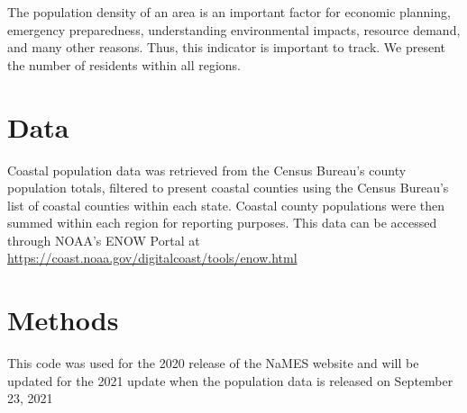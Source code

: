 \documentclass[
]{book}
\begin{document}
The population density of an area is an important factor for economic planning, emergency preparedness, understanding environmental impacts, resource demand, and many other reasons. Thus, this indicator is important to track. We present the number of residents within all regions.

\hypertarget{data-11}{%
\section{Data}\label{data-11}}

Coastal population data was retrieved from the Census Bureau's county population totals, filtered to present coastal counties using the Census Bureau's list of coastal counties within each state. Coastal county populations were then summed within each region for reporting purposes. This data can be accessed through NOAA's ENOW Portal at \url{https://coast.noaa.gov/digitalcoast/tools/enow.html}

\hypertarget{methods-11}{%
\section{Methods}\label{methods-11}}

This code was used for the 2020 release of the NaMES website and will be updated for the 2021 update when the population data is released on September 23, 2021
\end{document}

